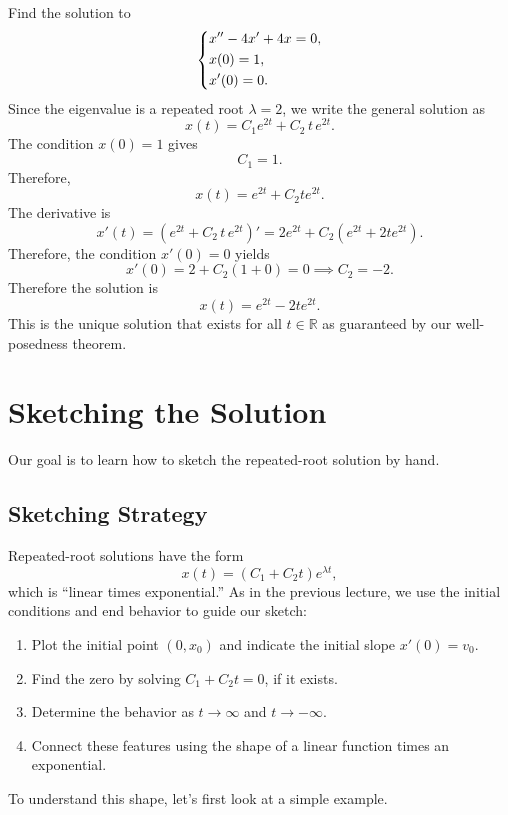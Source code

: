 \documentclass[10pt,letterpaper]{article}
\begin{document}
\begin{example}[1]{
Find the solution to
\[
\begin{dcases}
x''-4x'+4x=0, \\
x(0) = 1,\\
x'(0)=0.
\end{dcases}
\]
}
Since the eigenvalue is a repeated root $\lambda=2$, we write the general solution as  
\[
x(t)=C_1 e^{2t}+C_2 \,t\,e^{2 t}.
\]
The condition $x(0)=1$ gives
\[
C_1=1.
\]
Therefore,
\[
x(t)=e^{2t}+C_2te^{2t}.
\]
The derivative is
$$
x'(t) = (e^{2t}+C_2 \,t\,e^{2 t})' = 2e^{2t}+C_2(e^{2t}+2te^{2t}).
$$
Therefore, the condition $x'(0)=0$ yields 
$$
x'(0)=2+C_2(1+0) = 0 \implies C_2 = -2.
$$
Therefore the solution is 
$$
\boxed{
x(t) = e^{2t} - 2te^{2t}.
}
$$
This is the unique solution that exists for all $t\in \mathbb{R}$ as guaranteed by our well-posedness theorem.
\end{example}


\section{Sketching the Solution}
Our goal is to learn how to sketch the repeated-root solution by hand.


\subsection{Sketching Strategy}

Repeated-root solutions have the form
\[
x(t)=(C_1+C_2t)e^{\lambda t},
\]
which is ``linear times exponential.'' As in the previous lecture,
we use the initial conditions and end behavior to guide our sketch:
\begin{enumerate}
    \item Plot the initial point $(0,x_0)$ and indicate
    the initial slope $x'(0)=v_0$.
    \item Find the zero by solving $C_1+C_2t=0$, if it exists.
    \item Determine the behavior as $t\to\infty$ and $t\to-\infty$.
    \item Connect these features using the shape of
    a linear function times an exponential.
\end{enumerate}
To understand this shape, let's first look at a simple example.
\end{document}
